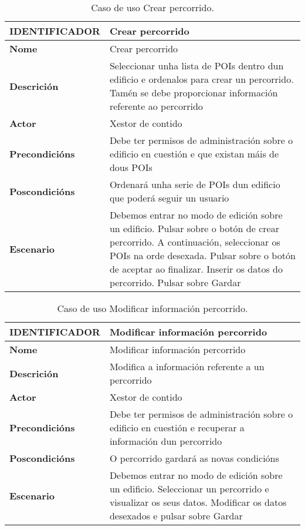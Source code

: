 \begin{table}[tbh]
	\begin{tabular}{|l|p{10cm}|}
		\hline 
		\textbf{IDENTIFICADOR}	& \textbf{Crear percorrido} \\ 
		\hline 
		\textbf{Nome} & Crear percorrido \\ 
		\hline 
		\textbf{Descrición} & Seleccionar unha lista de POIs dentro dun edificio e ordenalos para crear un percorrido. Tamén se debe proporcionar información referente ao percorrido \\ 
		\hline 
		\textbf{Actor} & Xestor de contido \\ 
		\hline 
		\textbf{Precondicións} & Debe ter permisos de administración sobre o edificio en cuestión e que existan máis de dous POIs \\ 
		\hline 
		\textbf{Poscondicións} & Ordenará unha serie de POIs dun edificio que poderá seguir un usuario \\ 
		\hline 
		\textbf{Escenario} & Debemos entrar no modo de edición sobre un edificio. Pulsar sobre o botón de crear percorrido. A continuación, seleccionar os POIs na orde desexada. Pulsar sobre o botón de aceptar ao finalizar. Inserir os datos do percorrido. Pulsar sobre Gardar \\ 
		\hline 
	\end{tabular}
	\caption{Caso de uso Crear percorrido.}
	\label{tab:cuCrearPercorrido}
\end{table}

\begin{table}[tbh]
	\begin{tabular}{|l|p{10cm}|}
		\hline 
		\textbf{IDENTIFICADOR}	& \textbf{Modificar información percorrido} \\ 
		\hline 
		\textbf{Nome} & Modificar información percorrido \\ 
		\hline 
		\textbf{Descrición} & Modifica a información referente a un percorrido \\ 
		\hline 
		\textbf{Actor} & Xestor de contido \\ 
		\hline 
		\textbf{Precondicións} & Debe ter permisos de administración sobre o edificio en cuestión e recuperar a información dun percorrido \\ 
		\hline 
		\textbf{Poscondicións} & O percorrido gardará as novas condicións \\ 
		\hline 
		\textbf{Escenario} & Debemos entrar no modo de edición sobre un edificio. Seleccionar un percorrido e visualizar os seus datos. Modificar os datos desexados e pulsar sobre Gardar \\ 
		\hline 
	\end{tabular}
	\caption{Caso de uso Modificar información percorrido.}
	\label{tab:cuModificarPercorrido}
\end{table}

